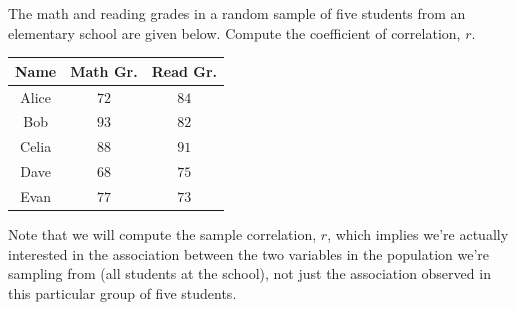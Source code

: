 \begin{example}\label{CorrelationEx}
The math and reading grades in a random sample of five students from an elementary school are given below. Compute the coefficient of correlation, $r$.

\begin{center}
\begin{minipage}{0.4\textwidth}
\renewcommand{\arraystretch}{1.25}
\begin{center}
\begin{tabular}{|c|c|c|}
\hline
Name & Math Gr. & Read Gr. \\
\hline
Alice & $72$ & $84$ \\
\hline
Bob & $93$ & $82$  \\
\hline
Celia & $88$ & $91$  \\
\hline
Dave & $68$ & $75$  \\
\hline
Evan & $77$ & $73$  \\
\hline
\end{tabular}
\vspace*{0.1in}
\end{center}
\end{minipage}\begin{minipage}{0.4\textwidth}
\begin{center}
\end{center}
\end{minipage}
\end{center}

Note that we will compute the sample correlation, $r$, which implies we're actually interested in the association between the two variables in the population we're sampling from (all students at the school), not just the association observed in this particular group of five students.


\end{example}
